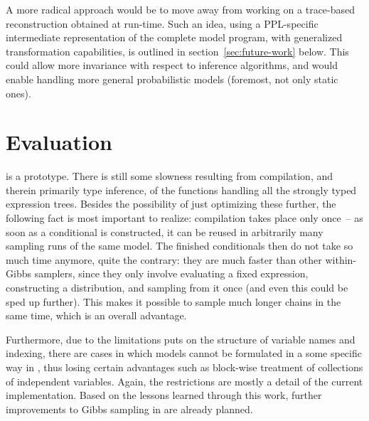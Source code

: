 A more radical approach would be to move away from working on a trace-based reconstruction obtained
at run-time.  Such an idea, using a PPL-specific intermediate representation of the complete model
program, with generalized transformation capabilities, is outlined in section~\ref{sec:future-work}
below.  This could allow more invariance with respect to inference algorithms, and would enable
handling more general probabilistic models (foremost, not only static ones).


\section{Evaluation}
\label{sec:autogibbs-eval}

\autogibbsjl{} is a prototype.  There is still some slowness resulting from compilation, and therein
primarily type inference, of the functions handling all the strongly typed expression trees.
Besides the possibility of just optimizing these further, the following fact is most important to
realize: compilation takes place only once~-- as soon as a conditional is constructed, it can be
reused in arbitrarily many sampling runs of the same model.  The finished conditionals then do not
take so much time anymore, quite the contrary: they are much faster than other within-Gibbs
samplers, since they only involve evaluating a fixed expression, constructing a distribution, and
sampling from it once (and even this could be sped up further).  This makes it possible to sample
much longer chains in the same time, which is an overall advantage.

Furthermore, due to the limitations \autogibbsjl{} puts on the structure of variable names and
indexing, there are cases in which models cannot be formulated in a some specific way in \dppljl{},
thus losing certain advantages such as block-wise treatment of collections of independent variables.
Again, the restrictions are mostly a detail of the current implementation.  Based on the lessons
learned through this work, further improvements to Gibbs sampling in \turingjl{} are already
planned.

